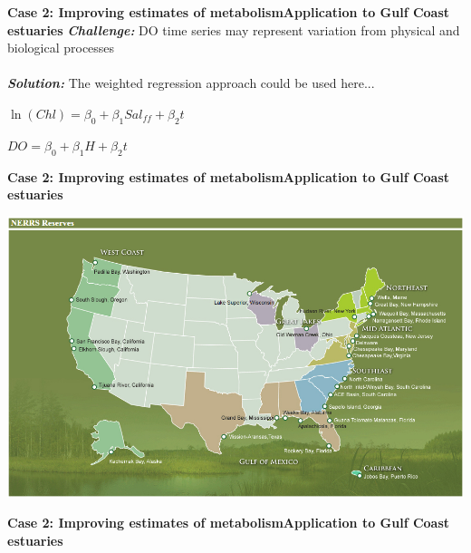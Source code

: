 \documentclass[serif]{beamer}\usepackage[]{graphicx}\usepackage[]{color}
\newcommand{\emtxt}[1]{\textbf{\textit{#1}}}
\begin{document}
\begin{frame}{\textbf{Case 2: Improving estimates of metabolism}}{\textbf{Application to Gulf Coast estuaries}}
\emtxt{Challenge:} DO time series may represent variation from physical and biological processes \\~\\
\emtxt{Solution:} The weighted regression approach could be used here...
\vspace{0.15in}
\begin{center}
$\ln\left(Chl\right) = \beta_0 + \beta_1 Sal_{ff} + \beta_2 t $
\end{center}
\vspace{0.05in}
\begin{center}
$DO = \beta_0 + \beta_1 H + \beta_2 t $
\end{center}
\end{frame}

\begin{frame}{\textbf{Case 2: Improving estimates of metabolism}}{\textbf{Application to Gulf Coast estuaries}}
\centerline{\includegraphics[width = \textwidth]{fig/NERRS_locations.png}}
\end{frame}



\begin{frame}{\textbf{Case 2: Improving estimates of metabolism}}{\textbf{Application to Gulf Coast estuaries}}
\begin{center}
\end{center}
\end{frame}
\end{document}
